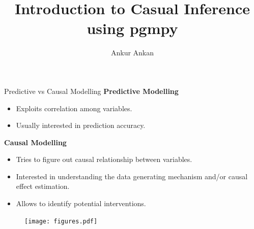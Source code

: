 \documentclass{beamer}
\begin{document}
\title[Causal Inference using pgmpy]{Introduction to Casual Inference using pgmpy}
\author{Ankur Ankan}
\date{}

\maketitle

\begin{frame}{Predictive vs Causal Modelling}
	\textbf{Predictive Modelling}
		\begin{itemize}
			\item Exploits correlation among variables.
			\item Usually interested in prediction accuracy.
		\end{itemize}
	\vspace{1em}
	\textbf{Causal Modelling}
		\begin{itemize}
			\item Tries to figure out causal relationship between variables.
			\item Interested in understanding the data generating mechanism and/or causal effect estimation.
			\item Allows to identify potential interventions.
		\end{itemize}

	\begin{figure}
		\centering
		\texttt{[image: figures.pdf]}
	\end{figure}
\end{frame}
\end{document}
